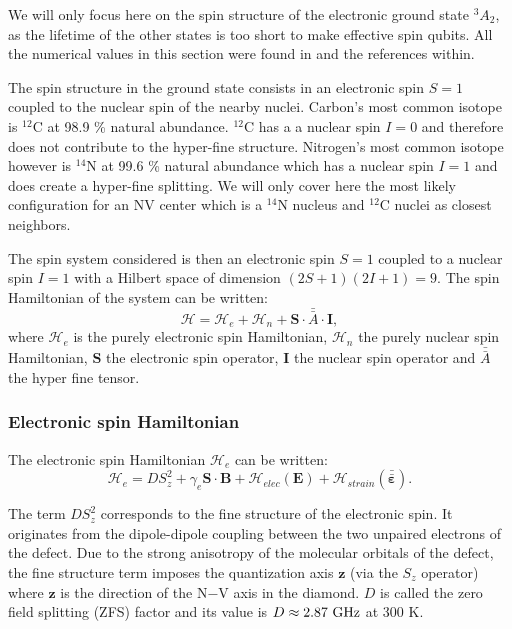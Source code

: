 \documentclass[a4paper, 11pt]{report}
\begin{document}
We will only focus here on the spin structure of the electronic ground state $^3A_2$, as the lifetime of the other states is too short to make effective spin qubits. All the numerical values in this section were found in \citep{smeltzer2009robust, doherty2013nitrogen} and the references within.

The spin structure in the ground state consists in an electronic spin $S=1$ coupled to the nuclear spin of the nearby nuclei. Carbon's most common isotope is $^{12}$C at 98.9 \% natural abundance. $^{12}$C has a a nuclear spin $I=0$ and therefore does not contribute to the hyper-fine structure. Nitrogen's most common isotope however is $^{14}$N at 99.6 \% natural abundance which has a nuclear spin $I=1$ and does create a hyper-fine splitting. We will only cover here the most likely configuration for an NV center which is a $^{14}$N nucleus and $^{12}$C nuclei as closest neighbors. 

The spin system considered is then an electronic spin $S=1$ coupled to a nuclear spin $I=1$ with a Hilbert space of dimension $(2S+1)(2I+1)=9$. The spin Hamiltonian of the system can be written:
\begin{equation}
\mathcal{H}=\mathcal{H}_e + \mathcal{H}_n + \mathbf{S}\cdot \bar{\bar{A}}\cdot \mathbf{I},
\end{equation}
where $\mathcal{H}_e$ is the purely electronic spin Hamiltonian, $\mathcal{H}_n$ the purely nuclear spin Hamiltonian, $\mathbf{S}$ the electronic spin operator, $\mathbf{I}$ the nuclear spin operator and $\bar{\bar{A}}$ the hyper fine tensor.
\subsubsection{Electronic spin Hamiltonian}
The electronic spin Hamiltonian $\mathcal{H}_e$ can be written:
\begin{equation}
\label{eq. spin elec}
\mathcal{H}_e=D S_z^2 + \gamma_e \mathbf{S} \cdot \mathbf{B} + \mathcal{H}_{elec}(\mathbf{E})+ \mathcal{H}_{strain}(\mathbf{\bar{\bar{\varepsilon}}}).
\end{equation}

The term $D S_z^2$ corresponds to the fine structure of the electronic spin. It originates from the dipole-dipole coupling between the two unpaired electrons of the defect. Due to the strong anisotropy of the molecular orbitals of the defect, the fine structure term imposes the quantization axis $\mathbf{z}$ (via the $S_z$ operator) where $\mathbf{z}$ is the direction of the N$-$V axis in the diamond. $D$ is called the zero field splitting (ZFS) factor and its value is $D\approx 2.87\ \rm GHz$ at 300 K.
\end{document}
